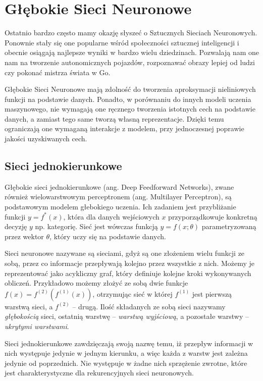 \documentclass[licencjacka]{pracamgr}
\begin{document}
\chapter{Głębokie Sieci Neuronowe}

Ostatnio bardzo często mamy okazję słyszeć o Sztucznych Sieciach Neuronowych. Ponownie stały się one popularne wśród społeczności sztucznej inteligencji i obecnie osiągają najlepsze wyniki w bardzo wielu dziedzinach. Pozwalają nam one nam na tworzenie autonomicznych pojazdów, rozpoznawać obrazy lepiej od ludzi czy pokonać mistrza świata w Go. 

Głębokie Sieci Neuronowe mają zdolność do tworzenia aproksymacji nieliniowych funkcji na podstawie danych. Ponadto, w porównaniu do innych modeli uczenia maszynowego, nie wymagają one ręcznego tworzenia istotnych cech na podstawie danych, a zamiast tego same tworzą własną reprezentacje. Dzięki temu ograniczają one wymaganą interakcje z modelem, przy jednoczesnej poprawie jakości uzyskiwanych cech.

\section{Sieci jednokierunkowe}

Głębokie sieci jednokierunkowe (ang. Deep Feedforward Networks), zwane również wielowarstwowym perceptronem (ang. Multilayer Perceptron), są podstawowym modelem głebokiego uczenia. Ich zadaniem jest przybliżanie funkcji $ y = f^{\ast}(x) $, która dla danych wejściowych $x$ przyporządkowuje konkretną decyzję $y$ np. kategorię. Sieć jest wówczas funkcją $ y = f(x; \theta) $ parametryzowaną przez wektor $\theta$, który uczy się na podstawie danych.

Sieci neuronowe nazywane są sieciami, gdyż są one złożeniem wielu funkcji ze sobą, przez co informacje przepływają kolejno przez wszystkie z nich. Możemy je reprezentować jako acykliczny graf, który definiuje kolejne kroki wykonywanych obliczeń. Przykładowo możemy złożyć ze sobą dwie funkcje $ f(x) = f^{(2)}(f^{(1)}(x)) $, otrzymując sieć w której $f^{(1)} $ jest pierwszą warstwą sieci, a $ f^{(2)} $ -- drugą. Ilość składanych ze sobą sieci nazywamy \emph{głębokością} sieci, ostatnią warstwę -- \emph{warstwą wyjściową}, a pozostałe warstwy -- \emph{ukrytymi warstwami}. 

Sieci jednokierunkowe zawdzięczają swoją nazwę temu, iż przepływ informacji w nich występuje jedynie w jednym kierunku, a więc każda z warstw jest zależna jedynie od poprzednich. Nie występuje w żadne nich sprzężenie zwrotne, które jest charakterystyczne dla rekurencyjnych sieci neuronowych.
\end{document}
